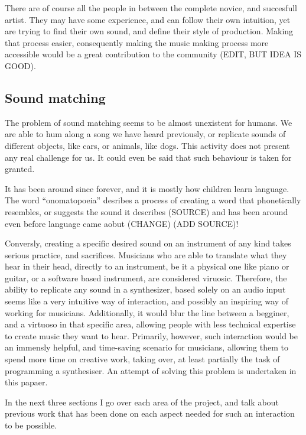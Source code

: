 There are of course all the people in between the complete novice, and
succesfull artist. They may have some experience, and can follow their
own intuition, yet are trying to find their own sound, and define
their style of production. Making that process easier, consequently
making the music making process more accessible would be a great
contribution to the community (EDIT, BUT IDEA IS GOOD).

\subsection{Sound matching}

The problem of sound matching seems to be almost unexistent for
humans. We are able to hum along a song we have heard previously, or
replicate sounds of different objects, like cars, or animals, like
dogs. This activity does not present any real challenge for us. It
could even be said that such behaviour is taken for
granted.

It has been around since forever, and it is mostly how children learn
language. The word ``onomatopoeia'' desribes a process of creating a
word that phonetically resembles, or suggests the sound it describes
(SOURCE) and has been around even before language came aobut (CHANGE)
(ADD SOURCE)!

Conversly, creating a specific desired sound on an instrument of any
kind takes serious practice, and sacrifices. Musicians who are able to
translate what they hear in their head, directly to an instrument, be
it a physical one like piano or guitar, or a software based
instrument, are considered viruosic. Therefore, the ability to
replicate any sound in a synthesizer, based solely on an audio input
seems like a very intuitive way of interaction, and possibly an
inspiring way of working for musicians. Additionally, it would blur the
line between a begginer, and a virtuoso in that specific area,
allowing people with less technical expertise to create music they
want to hear. Primarily, however, such interaction would be an immensly
helpful, and time-saving scenario for musicians, allowing them to
spend more time on creative work, taking over, at least partially the
task of programming a synthesiser. An attempt of solving this problem is undertaken in this papaer.

In the next three sections I go over each area of the project, and talk
about previous work that has been done on each aspect needed for such an interaction to be possible.

